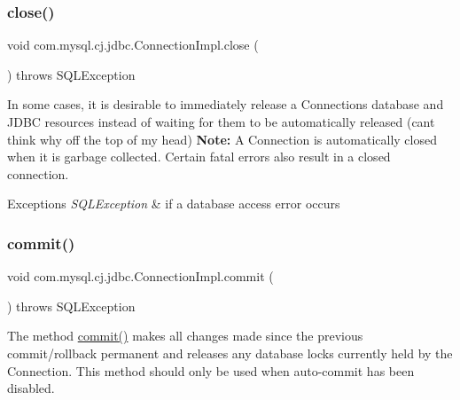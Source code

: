 \mbox{\label{classcom_1_1mysql_1_1cj_1_1jdbc_1_1_connection_impl_a9d82246a207b618a8ce3dfcf349c971d}} 
\subsubsection{\texorpdfstring{close()}{close()}}
{\footnotesize\ttfamily void com.\+mysql.\+cj.\+jdbc.\+Connection\+Impl.\+close (\begin{DoxyParamCaption}{ }\end{DoxyParamCaption}) throws S\+Q\+L\+Exception}

In some cases, it is desirable to immediately release a Connection\textquotesingle{}s database and J\+D\+BC resources instead of waiting for them to be automatically released (cant think why off the top of my head) {\bfseries Note\+:} A Connection is automatically closed when it is garbage collected. Certain fatal errors also result in a closed connection.


\begin{DoxyExceptions}{Exceptions}
{\em S\+Q\+L\+Exception} & if a database access error occurs \\
\hline
\end{DoxyExceptions}
\mbox{\label{classcom_1_1mysql_1_1cj_1_1jdbc_1_1_connection_impl_ac6218bc1a284e67ff9557bdefc52c388}} 
\subsubsection{\texorpdfstring{commit()}{commit()}}
{\footnotesize\ttfamily void com.\+mysql.\+cj.\+jdbc.\+Connection\+Impl.\+commit (\begin{DoxyParamCaption}{ }\end{DoxyParamCaption}) throws S\+Q\+L\+Exception}

The method \mbox{\hyperlink{classcom_1_1mysql_1_1cj_1_1jdbc_1_1_connection_impl_ac6218bc1a284e67ff9557bdefc52c388}{commit()}} makes all changes made since the previous commit/rollback permanent and releases any database locks currently held by the Connection. This method should only be used when auto-\/commit has been disabled. 

